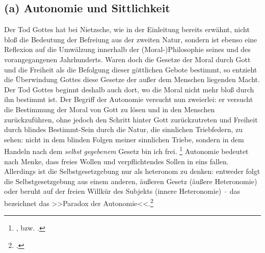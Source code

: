 \documentclass[12pt, a4paper, openany]{report}
\begin{document}
\subsection{(a) Autonomie und Sittlichkeit}
Der Tod Gottes hat bei Nietzsche, wie in der Einleitung bereits erwähnt, nicht bloß die Bedeutung der Befreiung aus der zweiten Natur, sondern ist ebenso eine Reflexion auf die Umwälzung innerhalb der (Moral-)Philosophie seines und des vorangegangenen Jahrhunderts. 
Waren doch die Gesetze der Moral durch Gott und die Freiheit als die Befolgung dieser göttlichen Gebote bestimmt, so entzieht die Überwindung Gottes diese Gesetze der außer dem Menschen liegenden Macht.
Der Tod Gottes beginnt deshalb auch dort, wo die Moral nicht mehr bloß durch ihn bestimmt ist. 
Der Begriff der Autonomie versucht nun zweierlei: 
er versucht die Bestimmung der Moral von Gott zu lösen und in den Menschen zurückzuführen, ohne jedoch den Schritt hinter Gott zurückzutreten und Freiheit durch blindes Bestimmt-Sein durch die Natur, die sinnlichen Triebfedern, zu sehen: nicht in dem blinden Folgen meiner sinnlichen Triebe, sondern in dem Handeln nach dem \emph{selbst gegebenem} Gesetz bin ich frei.
\footnote{
    \cite[Vgl.][19]{menke_autonomie_2018},
    bzw. .
}
Autonomie bedeutet nach Menke, dass freies Wollen und verpflichtendes Sollen in eins fallen.
Allerdings ist die Selbstgesetzgebung nur als heteronom zu denken:  
entweder folgt die Selbstgesetzgebung aus einem anderen, äußeren Gesetz (äußere Heteronomie) oder beruht auf der freien Willkür des Subjekts (innere Heteronomie) -- das bezeichnet das >>Paradox der Autonomie<<.\footcite[Vgl.][S. 19 - S. 20.]{menke_autonomie_2018}
\end{document}

